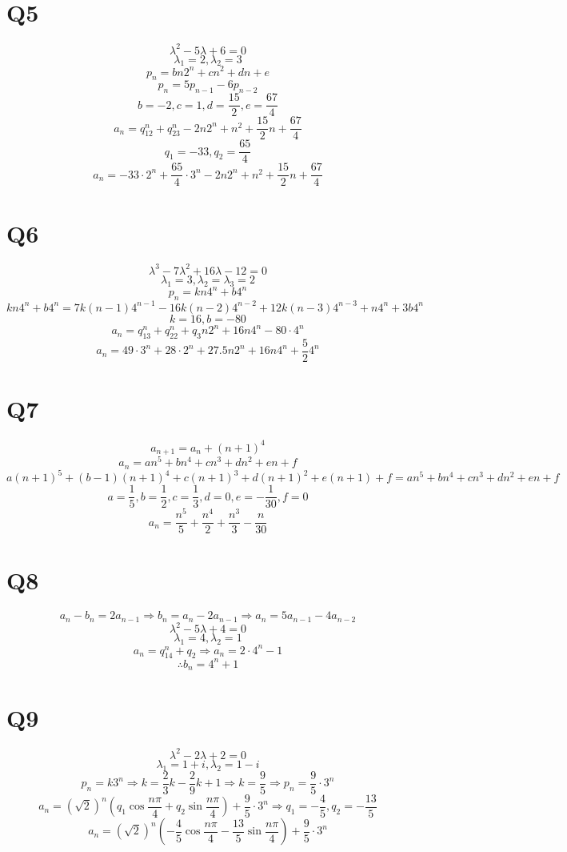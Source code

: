 \documentclass[12pt]{article}
\begin{document}
\section{Q5}
$$\lambda^2-5\lambda+6=0$$
$$\lambda_1=2,\lambda_2=3$$
$$p_n=bn2^n+cn^2+dn+e$$
$$p_n=5p_{n-1}-6p_{n-2}$$
$$b=-2,c=1,d=\frac{15}{2},e=\frac{67}{4}$$
$$a_n=q_12^n+q_23^n-2n2^n+n^2+\frac{15}{2}n+\frac{67}{4}$$
$$q_1=-33,q_2=\frac{65}{4}$$
$$a_n=-33\cdot2^n+\frac{65}{4}\cdot3^n-2n2^n+n^2+\frac{15}{2}n+\frac{67}{4}$$
\section{Q6}
$$\lambda^3-7\lambda^2+16\lambda-12=0$$
$$\lambda_1=3,\lambda_2=\lambda_3=2$$
$$p_n=kn4^n+b4^n$$
$$kn4^n+b4^n=7k(n-1)4^{n-1}-16k(n-2)4^{n-2}+12k(n-3)4^{n-3}+n4^n+3b4^n$$
$$k=16,b=-80$$
$$a_n=q_13^n+q_22^n+q_3n2^n+16n4^n-80\cdot4^n$$
$$a_n=49\cdot3^n+28\cdot2^n+27.5n2^n+16n4^n+\frac{5}{2}4^n$$
\section{Q7}
$$a_{n+1}=a_n+(n+1)^4$$
$$a_n=an^5+bn^4+cn^3+dn^2+en+f$$
$$a(n+1)^5+(b-1)(n+1)^4+c(n+1)^3+d(n+1)^2+e(n+1)+f=an^5+bn^4+cn^3+dn^2+en+f$$
$$a=\frac{1}{5},b=\frac{1}{2},c=\frac{1}{3},d=0,e=-\frac{1}{30},f=0$$
$$a_n=\frac{n^5}{5}+\frac{n^4}{2}+\frac{n^3}{3}-\frac{n}{30}$$
\section{Q8}
$$a_n-b_n=2a_{n-1}\Rightarrow b_n=a_n-2a_{n-1}\Rightarrow a_{n}=5a_{n-1}-4a_{n-2}$$
$$\lambda^2-5\lambda+4=0$$
$$\lambda_1=4,\lambda_2=1$$
$$a_n=q_14^n+q_2\Rightarrow a_n=2\cdot4^{n}-1$$
$$\therefore b_n=4^n+1$$
\section{Q9}
$$\lambda^2-2\lambda+2=0$$
$$\lambda_1=1+i,\lambda_2=1-i$$
$$p_n=k3^n\Rightarrow k=\frac{2}{3}k-\frac{2}{9}k+1\Rightarrow k=\frac{9}{5}\Rightarrow p_n=\frac{9}{5}\cdot3^n$$
$$a_n=(\sqrt{2})^n(q_1\cos\frac{n\pi}{4}+q_2\sin\frac{n\pi}{4})+\frac{9}{5}\cdot 3^n\Rightarrow q_1=-\frac{4}{5},q_2=-\frac{13}{5}$$
$$a_n=(\sqrt{2})^n(-\frac{4}{5}\cos\frac{n\pi}{4}-\frac{13}{5}\sin\frac{n\pi}{4})+\frac{9}{5}\cdot 3^n$$
\end{document}
